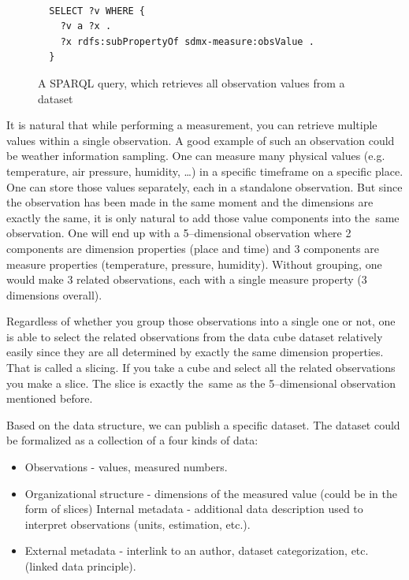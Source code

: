 \begin{figure}
\begin{verbatim}
  
  SELECT ?v WHERE {
    ?v a ?x .
    ?x rdfs:subPropertyOf sdmx-measure:obsValue .
  }

\end{verbatim}
\caption{A SPARQL query, which retrieves all observation values from a dataset}
\label{fig:sparql-obsValue}
\end{figure}

It is natural that while performing a measurement, you can retrieve multiple
values within a single observation. A good example of such an observation could be weather
information sampling. One can measure many physical values (e.g. temperature, air pressure,
humidity, …) in a specific timeframe on a specific place. One can store those values separately,
each in a standalone observation. But since the observation has been made in the same moment
and the dimensions are exactly the same, it is only natural to add those value components into
the~same observation. One will end up with a 5--dimensional observation where 2 components 
are dimension properties (place and time) and 3 components are measure properties
(temperature, pressure, humidity). Without grouping, one would make 3 related observations,
each with a single measure property (3 dimensions overall).

Regardless of whether you group those observations into a single one or not, one is able
to select the related observations from the data cube dataset relatively easily since they
are all determined by exactly the same dimension properties. That is called a slicing.
If you take a cube and select all the related observations you make a slice. The slice is exactly
the~same as the 5--dimensional observation mentioned before.

Based on the data structure, we can publish a specific dataset. The dataset could be formalized
as a collection of a four kinds of data:

\begin{itemize}
\item Observations - values, measured numbers.
\item Organizational structure - dimensions of the measured value (could be in the form of slices)
Internal metadata - additional data description used to interpret observations (units, estimation,
etc.).
\item External metadata - interlink to an author, dataset categorization, etc. (linked data 
principle).
\end{itemize}

